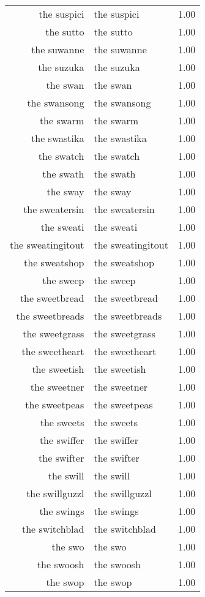 \begin{table}[ht]
\begin{tabular}{rlr}
  the suspici & the suspici & 1.00 \\ 
  the sutto & the sutto & 1.00 \\ 
  the suwanne & the suwanne & 1.00 \\ 
  the suzuka & the suzuka & 1.00 \\ 
  the swan & the swan & 1.00 \\ 
  the swansong & the swansong & 1.00 \\ 
  the swarm & the swarm & 1.00 \\ 
  the swastika & the swastika & 1.00 \\ 
  the swatch & the swatch & 1.00 \\ 
  the swath & the swath & 1.00 \\ 
  the sway & the sway & 1.00 \\ 
  the sweatersin & the sweatersin & 1.00 \\ 
  the sweati & the sweati & 1.00 \\ 
  the sweatingitout & the sweatingitout & 1.00 \\ 
  the sweatshop & the sweatshop & 1.00 \\ 
  the sweep & the sweep & 1.00 \\ 
  the sweetbread & the sweetbread & 1.00 \\ 
  the sweetbreads & the sweetbreads & 1.00 \\ 
  the sweetgrass & the sweetgrass & 1.00 \\ 
  the sweetheart & the sweetheart & 1.00 \\ 
  the sweetish & the sweetish & 1.00 \\ 
  the sweetner & the sweetner & 1.00 \\ 
  the sweetpeas & the sweetpeas & 1.00 \\ 
  the sweets & the sweets & 1.00 \\ 
  the swiffer & the swiffer & 1.00 \\ 
  the swifter & the swifter & 1.00 \\ 
  the swill & the swill & 1.00 \\ 
  the swillguzzl & the swillguzzl & 1.00 \\ 
  the swings & the swings & 1.00 \\ 
  the switchblad & the switchblad & 1.00 \\ 
  the swo & the swo & 1.00 \\ 
  the swoosh & the swoosh & 1.00 \\ 
  the swop & the swop & 1.00 \\ 

\end{tabular}
\end{table}
